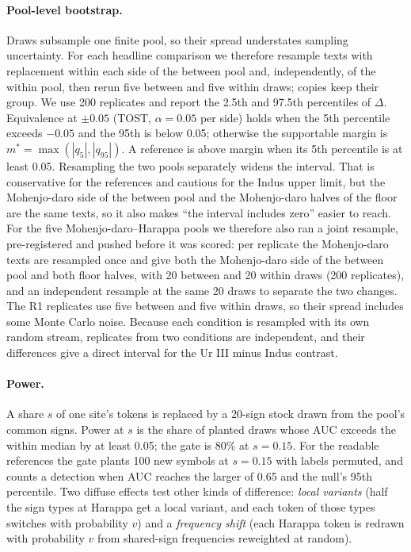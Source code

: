 \documentclass[11pt,a4paper]{article}
\begin{document}
\paragraph{Pool-level bootstrap.} Draws subsample one finite pool, so their spread understates sampling uncertainty.
For each headline comparison we therefore resample texts with replacement within each side of the between pool and, independently, of the within pool, then rerun five between and five within draws; copies keep their group. %
We use 200 replicates and report the 2.5th and 97.5th percentiles of $\Delta$.
Equivalence at $\pm 0.05$ (TOST, $\alpha = 0.05$ per side) holds when the 5th percentile exceeds $-0.05$ and the 95th is below 0.05; otherwise the supportable margin is $m^* = \max(|q_5|, |q_{95}|)$.
A reference is above margin when its 5th percentile is at least 0.05. %
Resampling the two pools separately widens the interval.
That is conservative for the references and cautious for the Indus upper limit, but the Mohenjo-daro side of the between pool and the Mohenjo-daro halves of the floor are the same texts, so it also makes ``the interval includes zero'' easier to reach.
For the five Mohenjo-daro--Harappa pools we therefore also ran a joint resample, pre-registered and pushed before it was scored: per replicate the Mohenjo-daro texts are resampled once and give both the Mohenjo-daro side of the between pool and both floor halves, with 20 between and 20 within draws (200 replicates), and an independent resample at the same 20 draws to separate the two changes. %
The R1 replicates use five between and five within draws, so their spread includes some Monte Carlo noise.
Because each condition is resampled with its own random stream, replicates from two conditions are independent, and their differences give a direct interval for the Ur III minus Indus contrast. %

\paragraph{Power.} A share $s$ of one site's tokens is replaced by a 20-sign stock drawn from the pool's common signs.
Power at $s$ is the share of planted draws whose AUC exceeds the within median by at least 0.05; the gate is 80\% at $s = 0.15$. %
For the readable references the gate plants 100 new symbols at $s = 0.15$ with labels permuted, and counts a detection when AUC reaches the larger of 0.65 and the null's 95th percentile. %
Two diffuse effects test other kinds of difference: \emph{local variants} (half the sign types at Harappa get a local variant, and each token of those types switches with probability $v$) and a \emph{frequency shift} (each Harappa token is redrawn with probability $v$ from shared-sign frequencies reweighted at random). %
\end{document}
